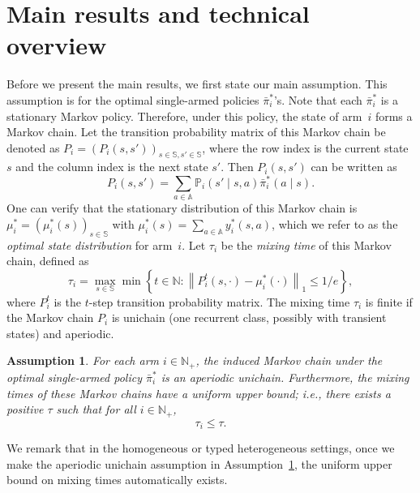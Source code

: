 \documentclass{article}
\theoremstyle{plain}
\newtheorem{assumption}{Assumption}
\theoremstyle{remark}
\newcommand{\norm}[1]{\left\lVert#1\right\rVert}
\newcommand{\sspa}{\mathbb{S}}
\newcommand{\aspa}{\mathbb{A}}
\newcommand{\pibar}{{\sysbar{\pi}}}
\newcommand{\sysbar}[1]{\bar{#1}}
\newcommand{\tmix}{\tau}
\newcommand{\PP}{\mathbb{P} }
\begin{document}
\section{Main results and technical overview}\label{sec:result-tech-overview}
Before we present the main results, we first state our main assumption.
This assumption is for the optimal single-armed policies $\pibar^*_i$'s.
Note that each $\pibar^*_i$ is a stationary Markov policy.
Therefore, under this policy, the state of arm~$i$ forms a Markov chain.
Let the transition probability matrix of this Markov chain be denoted as $P_i=(P_i(s,s'))_{s\in\sspa,s'\in\sspa}$, where the row index is the current state $s$ and the column index is the next state $s'$.
Then $P_i(s,s')$ can be written as
\begin{equation}
    P_i(s,s') = \sum_{a\in \aspa} \PP_i(s'\mid s,a)\bar{\pi}_i^*(a\mid s).
\end{equation}
One can verify that the stationary distribution of this Markov chain is $\mu_i^*=(\mu_i^*(s))_{s\in\sspa}$ with $\mu_i^*(s)=\sum_{a\in\aspa}y^*_i(s,a)$, which we refer to as the \emph{optimal state distribution} for arm~$i$. 
Let $\tmix_i$ be the \emph{mixing time} of this Markov chain, defined as
\begin{equation}
    \tmix_i=\max_{s\in\sspa} \min\left\{t\in\mathbb{N}\colon \norm{P_i^t(s,\cdot) - \mu^*_i(\cdot)}_1 \leq 1/e \right\},
\end{equation}
where $P_i^t$ is the $t$-step transition probability matrix. The mixing time $\tmix_i$ is finite if the Markov chain $P_i$ is unichain (one recurrent class, possibly with transient states) and aperiodic. 


\begin{assumption}\label{ass:unichain}
    For each arm $i\in\mathbb{N}_+$, the induced Markov chain under the optimal single-armed policy $\bar{\pi}_i^*$ is an aperiodic unichain. 
    Furthermore, the mixing times of these Markov chains have a uniform upper bound; i.e., there exists a positive $\tau$ such that for all $i\in\mathbb{N}_+$, 
    \begin{equation}
        \tmix_i \leq \tau.
    \end{equation}
\end{assumption}

We remark that in the homogeneous or typed heterogeneous settings, once we make the aperiodic unichain assumption in Assumption~\ref{ass:unichain}, the uniform upper bound on mixing times automatically exists.
\end{document}
